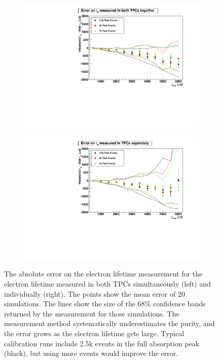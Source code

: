 \documentclass[herrin-thesis.tex]{subfiles}
\begin{document}
\begin{figure}[htb]
\begin{subfigure}[b]{0.5\linewidth}
\centering
\includegraphics[width=1.0\columnwidth]{./plots/el_sim_error_both.pdf}
\end{subfigure}%
\begin{subfigure}[b]{0.5\linewidth}
\centering
\includegraphics[width=1.0\columnwidth]{./plots/el_sim_error_indiv.pdf}
\end{subfigure}
\caption[Error on reconstructed electron lifetime from simulation]{The absolute error on the electron lifetime measurement for the electron lifetime measured in both TPCs simultaneously (left) and individually (right). The points show the mean error of 20 simulations. The lines show the size of the 68\% confidence bands returned by the measurement for those simulations. The measurement method systematically underestimates the purity, and the error grows as the electron lifetime gets large. Typical calibration runs include 2.5k events in the full absorption peak (black), but using more events would improve the error.}
\label{fig:el_sim_err}
\end{figure}
\end{document}
